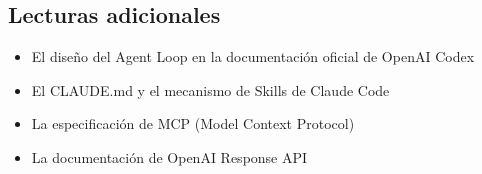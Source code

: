 \documentclass[a4paper]{article}
\begin{document}
\subsection{Lecturas adicionales}

\begin{itemize}
    \item El diseño del Agent Loop en la documentación oficial de OpenAI Codex
    \item El CLAUDE.md y el mecanismo de Skills de Claude Code
    \item La especificación de MCP (Model Context Protocol)
    \item La documentación de OpenAI Response API
\end{itemize}

\end{document}
